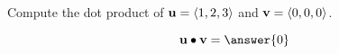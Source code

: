 \documentclass{ximera}
\author{Gregory Hartman \and Matthew Carr}
\begin{document}
\begin{exercise}



Compute the dot product of $\mathbf{u}=\left\langle 1,2,3\right\rangle$ and $\mathbf{v}=\left\langle 0,0,0\right\rangle$.

\begin{prompt}
\[
\vec{u}\dotp\vec{v}=\answer{0}
\]
\end{prompt}

\end{exercise}
\end{document}
